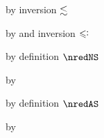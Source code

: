 {\begin{lamportproof*}
    \begin{pfproof}
        \begin{pfproof}
            \begin{pfproof}
              by inversion $\lesssim$
            \end{pfproof}
            \begin{pfproof}
              by  and inversion $\subteq$
            \end{pfproof}
            \begin{pfproof}
              by definition $\nredNS$
            \end{pfproof}
            \begin{pfproof}
              by 
            \end{pfproof}
            \begin{pfproof}
              by definition $\nredAS$
            \end{pfproof}
            \begin{pfproof}
              by 

\end{pfproof}
\end{pfproof}
\end{pfproof}
\end{lamportproof*}}
